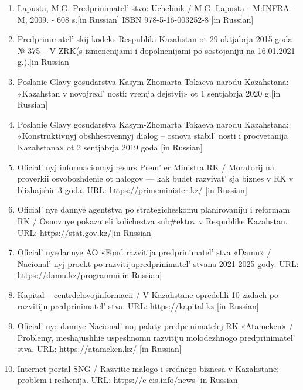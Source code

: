   \begin{references}

\begin{enumerate}
\def\labelenumi{\arabic{enumi}.}
\item
  Lapusta, M.G. Predprinimatel' stvo: Uchebnik / M.G.
  Lapusta - M:INFRA-M, 2009. - 608 s.{[}in Russian{]} ISBN
  978-5-16-003252-8 {[}in Russian{]}
\item
  Predprinimatel' skij kodeks Respubliki Kazahstan ot 29
  oktjabrja 2015 goda № 375 -- V ZRK(s izmenenijami i dopolnenijami po
  sostojaniju na 16.01.2021 g.).{[}in Russian{]}
\item
  Poslanie Glavy gosudarstva Kasym-Zhomarta Tokaeva narodu Kazahstana:
  «Kazahstan v novojreal' nosti: vremja dejstvij» ot 1
  sentjabrja 2020 g.{[}in Russian{]}
\item
  Poslanie Glavy gosudarstva Kasym-Zhomarta Tokaeva narodu Kazahstana:
  «Konstruktivnyj obshhestvennyj dialog -- osnova
  stabil' nosti i procvetanija Kazahstana» ot 2
  sentjabrja 2019 goda {[}in Russian{]}
\item
  Oficial' nyj informacionnyj resurs
  Prem' er Ministra RK / Moratorij na proverkii
  osvobozhdenie ot nalogov --- kak budet razvivat' sja
  biznes v RK v blizhajshie 3 goda. URL: \url{https://primeminister.kz/}
  {[}in Russian{]}
\item
  Oficial' nye dannye agentstva po strategicheskomu
  planirovaniju i reformam RK / Osnovnye pokazateli kolichestva
  sub\#ektov v Respublike Kazahstan. URL:
  \url{https://stat.gov.kz/}{[}in Russian{]}
\item
  Oficial' nyedannye AO «Fond razvitija
  predprinimatel' stva «Damu» /
  Nacional' nyj proekt po
  razvitijupredprinimatel' stvana 2021-2025 gody. URL:
  \url{https://damu.kz/programmi}{[}in Russian{]}
\item
  Kapital -- centrdelovojinformacii / V Kazahstane opredelili 10 zadach
  po razvitiju predprinimatel' stva. URL:
  \url{https://kapital.kz} {[}in Russian{]}
\item
  Oficial' nye dannye Nacional' noj palaty
  predprinimatelej RK «Atameken» / Problemy, meshajushhie uspeshnomu
  razvitiju molodezhnogo predprinimatel' stva. URL:
  \url{https://atameken.kz/} {[}in Russian{]}
\item
  Internet portal SNG / Razvitie malogo i srednego biznesa v Kazahstane:
  problem i reshenija. URL: \url{https://e-cis.info/news} {[}in
  Russian{]}
\end{enumerate}
\end{references}
